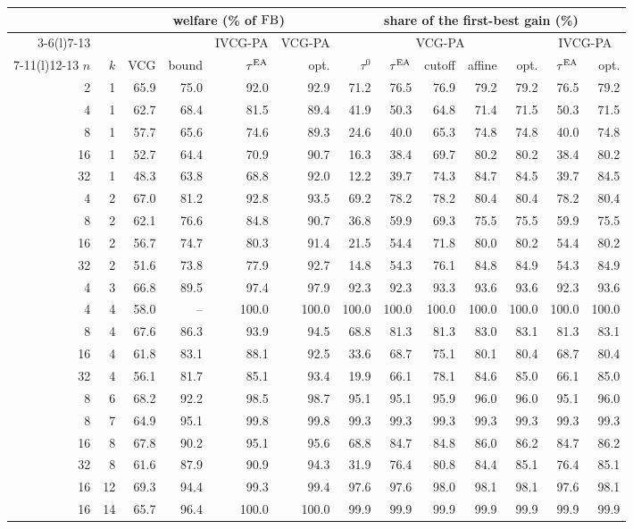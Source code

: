 \begin{tabular}{@{}rrrrrrrrrrrrr@{}}
\toprule
 & & \multicolumn{4}{c}{welfare (\% of $\mathrm{FB}$)} & \multicolumn{7}{c}{share of the first-best gain (\%)}\\
\cmidrule(lr){3-6}\cmidrule(l){7-13}
 & & & & IVCG-PA & VCG-PA & \multicolumn{5}{c}{VCG-PA} & \multicolumn{2}{c}{IVCG-PA}\\
\cmidrule(lr){7-11}\cmidrule(l){12-13}
$n$ & $k$ & VCG & bound & $\tau^{\mathrm{EA}}$ & opt. & $\tau^0$ & $\tau^{\mathrm{EA}}$ & cutoff & affine & opt. & $\tau^{\mathrm{EA}}$ & opt.\\
\midrule
2 & 1 & 65.9 & 75.0 & 92.0 & 92.9 & 71.2 & 76.5 & 76.9 & 79.2 & 79.2 & 76.5 & 79.2 \\
4 & 1 & 62.7 & 68.4 & 81.5 & 89.4 & 41.9 & 50.3 & 64.8 & 71.4 & 71.5 & 50.3 & 71.5 \\
8 & 1 & 57.7 & 65.6 & 74.6 & 89.3 & 24.6 & 40.0 & 65.3 & 74.8 & 74.8 & 40.0 & 74.8 \\
16 & 1 & 52.7 & 64.4 & 70.9 & 90.7 & 16.3 & 38.4 & 69.7 & 80.2 & 80.2 & 38.4 & 80.2 \\
32 & 1 & 48.3 & 63.8 & 68.8 & 92.0 & 12.2 & 39.7 & 74.3 & 84.7 & 84.5 & 39.7 & 84.5 \\
4 & 2 & 67.0 & 81.2 & 92.8 & 93.5 & 69.2 & 78.2 & 78.2 & 80.4 & 80.4 & 78.2 & 80.4 \\
8 & 2 & 62.1 & 76.6 & 84.8 & 90.7 & 36.8 & 59.9 & 69.3 & 75.5 & 75.5 & 59.9 & 75.5 \\
16 & 2 & 56.7 & 74.7 & 80.3 & 91.4 & 21.5 & 54.4 & 71.8 & 80.0 & 80.2 & 54.4 & 80.2 \\
32 & 2 & 51.6 & 73.8 & 77.9 & 92.7 & 14.8 & 54.3 & 76.1 & 84.8 & 84.9 & 54.3 & 84.9 \\
4 & 3 & 66.8 & 89.5 & 97.4 & 97.9 & 92.3 & 92.3 & 93.3 & 93.6 & 93.6 & 92.3 & 93.6 \\
4 & 4 & 58.0 & -- & 100.0 & 100.0 & 100.0 & 100.0 & 100.0 & 100.0 & 100.0 & 100.0 & 100.0 \\
8 & 4 & 67.6 & 86.3 & 93.9 & 94.5 & 68.8 & 81.3 & 81.3 & 83.0 & 83.1 & 81.3 & 83.1 \\
16 & 4 & 61.8 & 83.1 & 88.1 & 92.5 & 33.6 & 68.7 & 75.1 & 80.1 & 80.4 & 68.7 & 80.4 \\
32 & 4 & 56.1 & 81.7 & 85.1 & 93.4 & 19.9 & 66.1 & 78.1 & 84.6 & 85.0 & 66.1 & 85.0 \\
8 & 6 & 68.2 & 92.2 & 98.5 & 98.7 & 95.1 & 95.1 & 95.9 & 96.0 & 96.0 & 95.1 & 96.0 \\
8 & 7 & 64.9 & 95.1 & 99.8 & 99.8 & 99.3 & 99.3 & 99.3 & 99.3 & 99.3 & 99.3 & 99.3 \\
16 & 8 & 67.8 & 90.2 & 95.1 & 95.6 & 68.8 & 84.7 & 84.8 & 86.0 & 86.2 & 84.7 & 86.2 \\
32 & 8 & 61.6 & 87.9 & 90.9 & 94.3 & 31.9 & 76.4 & 80.8 & 84.4 & 85.1 & 76.4 & 85.1 \\
16 & 12 & 69.3 & 94.4 & 99.3 & 99.4 & 97.6 & 97.6 & 98.0 & 98.1 & 98.1 & 97.6 & 98.1 \\
16 & 14 & 65.7 & 96.4 & 100.0 & 100.0 & 99.9 & 99.9 & 99.9 & 99.9 & 99.9 & 99.9 & 99.9 \\
\bottomrule
\end{tabular}
